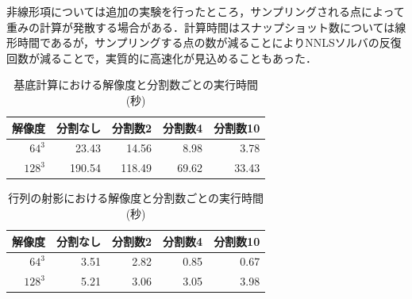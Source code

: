 \documentclass[a4j,12pt]{jreport}
\begin{document}
非線形項については追加の実験を行ったところ，サンプリングされる点によって重みの計算が発散する場合がある．計算時間はスナップショット数については線形時間であるが，サンプリングする点の数が減ることによりNNLSソルバの反復回数が減ることで，実質的に高速化が見込めることもあった．
\begin {table}[htbp]
    \centering
  \caption{基底計算における解像度と分割数ごとの実行時間(秒)}
  \label{tab:basis}
  \begin {tabular}{rrrrr} \hline
    \multicolumn{1}{c}{解像度} 					&\multicolumn{1}{c}{分割なし} 		&\multicolumn{1}{c}{分割数2}			&\multicolumn{1}{c}{分割数4} 		&\multicolumn{1}{c}{分割数10}\\ \hline
    $64^3$ 					& 23.43 			&14.56	 		&8.98	 	&3.78\\
    $128^3$ 				& 190.54 			&118.49 			& 69.62 		&33.43\\ \hline
  \end {tabular}
\end {table}


\begin {table}[htbp]
    \centering
  \caption{行列の射影における解像度と分割数ごとの実行時間(秒)}
  \label{tab:projection}
  \begin {tabular}{rrrrr} \hline
    \multicolumn{1}{c}{解像度} 					&\multicolumn{1}{c}{分割なし} 		&\multicolumn{1}{c}{分割数2}			&\multicolumn{1}{c}{分割数4} 		&\multicolumn{1}{c}{分割数10}\\ \hline
    $64^3$ 					& 3.51 			&2.82	 		&0.85	 		&0.67\\
    $128^3$ 				& 5.21 			& 3.06 			& 3.05 			&3.98\\ \hline
  \end {tabular}
\end {table}



\end{document}

